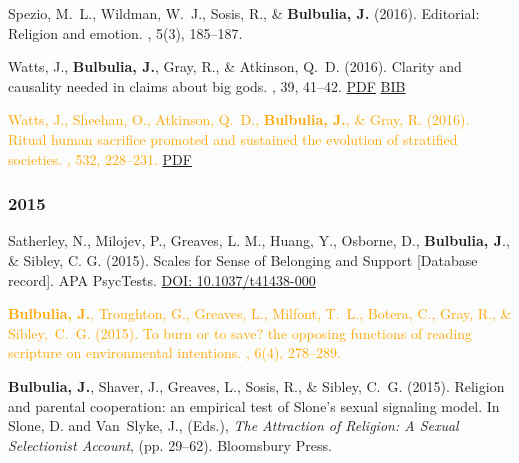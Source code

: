 \documentclass{article}
\begin{document}
\begin{thebibliography}{99}
Spezio, M.~L., Wildman, W.~J., Sosis, R., \& {\bf Bulbulia, J.} (2016). Editorial: 
\newblock Religion and emotion.
, 5(3), 185--187.


Watts, J., {\bf Bulbulia, J.}, Gray, R., \& Atkinson, Q.~D. (2016).
\newblock Clarity and causality needed in claims about big gods.
, 39, 41--42.
\href{https://www.dropbox.com/s/xag576vua0i80gq/2016WattsBBSResponseBigGods.pdf?dl=0}{PDF} \href{https://www.dropbox.com/s/71veqhxsq84ufao/wattsEtAl.2016.BigGodsResponse.bib?dl=0}{BIB}


\textcolor{Orange}{Watts, J., Sheehan, O., Atkinson, Q.~D., {\bf Bulbulia, J.}, \& Gray, R. (2016).
\newblock Ritual human sacrifice promoted and sustained the evolution of
  stratified societies.
, 532, 228--231.}
\href{https://www.dropbox.com/s/e5avan4ex1nkgi6/nature17159.pdf?dl=0}{PDF}



\subsubsection*{2015} 


Satherley, N., Milojev, P., Greaves, L. M., Huang, Y., Osborne, D., {\bf Bulbulia, J}., \& Sibley, C. G. (2015).
\newblock Scales for Sense of Belonging and Support [Database record].
\newblock APA PsycTests.
\href{https://doi.org/10.1037/t41438-000}{DOI: 10.1037/t41438-000}


\textcolor{Orange}{{\bf Bulbulia, J.}, Troughton, G., Greaves, L., Milfont, T.~L., Botera, C., Gray, R., \& Sibley,~C.~G. (2015).
\newblock To burn or to save? the opposing functions of reading scripture on
  environmental intentions.
, 6(4), 278--289. }


{\bf Bulbulia, J.}, Shaver, J., Greaves, L., Sosis, R., \& Sibley, C.~G. (2015).
\newblock Religion and parental cooperation: an empirical test of {S}lone's
  sexual signaling model.
\newblock In Slone, D. and Van~Slyke, J., (Eds.), {\em The Attraction of
  Religion: A Sexual Selectionist Account}, (pp. 29--62). Bloomsbury Press. 
 


\end{thebibliography}
\end{document}
